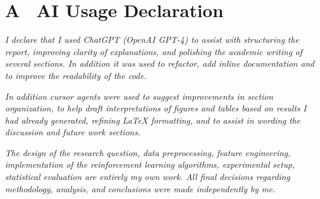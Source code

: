 \newpage
\appendix 
{}

\section*{A \ AI Usage Declaration}

\emph{I declare that I used ChatGPT (OpenAI GPT-4) to assist with structuring the report, 
improving clarity of explanations, and polishing the 
academic writing of several sections. In addition it was used to refactor, add inline documentation and to improve the readability of the code.}

\emph{In addition cursor agents were used to suggest improvements in section organization, 
to help draft interpretations of figures and tables based on results I had already generated, 
refining LaTeX formatting, and to assist in wording the discussion and future work sections.}

\emph{The design of the research question, data preprocessing, feature engineering, 
implementation of the reinforcement learning algorithms, experimental setup, 
statistical evaluation are entirely my own work. All final decisions regarding methodology, analysis, and conclusions were made independently by me.}

